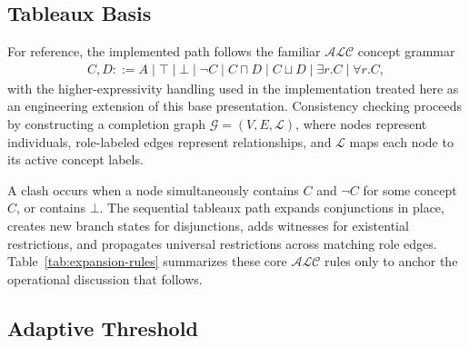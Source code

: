 \documentclass[preprint,12pt,times]{elsarticle}
\begin{document}
\subsection{Tableaux Basis}
\label{sec:tableaux-calculus}

For reference, the implemented path follows the familiar $\mathcal{ALC}$ concept grammar
\begin{align}
C, D ::= A \mid \top \mid \bot \mid \neg C \mid C \sqcap D \mid C \sqcup D \mid \exists r.C \mid \forall r.C,
\end{align}
with the higher-expressivity handling used in the implementation treated here as an engineering extension of this base presentation. Consistency checking proceeds by constructing a completion graph $\mathcal{G} = (V,E,\mathcal{L})$, where nodes represent individuals, role-labeled edges represent relationships, and $\mathcal{L}$ maps each node to its active concept labels.

A clash occurs when a node simultaneously contains $C$ and $\neg C$ for some concept $C$, or contains $\bot$. The sequential tableaux path expands conjunctions in place, creates new branch states for disjunctions, adds witnesses for existential restrictions, and propagates universal restrictions across matching role edges. Table~\ref{tab:expansion-rules} summarizes these core $\mathcal{ALC}$ rules only to anchor the operational discussion that follows.

\begin{table}[htbp]
\centering
\caption{Compact $\mathcal{ALC}$ Expansion Rules}
\label{tab:expansion-rules}
\end{table}

\subsection{Adaptive Threshold}
\label{sec:adaptive-formal}
\end{document}
